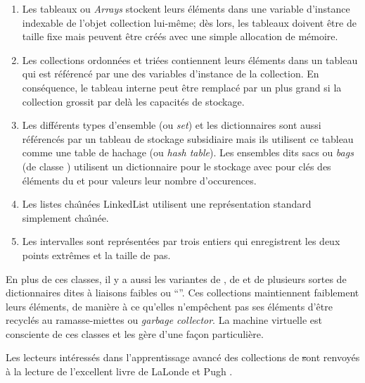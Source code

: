 \documentclass[a4paper,10pt,twoside]{book}
\begin{document}
\begin{enumerate}
  \item Les tableaux ou \emph{Arrays} stockent leurs \'el\'ements dans une
variable d'instance indexable de l'objet collection lui-m\^eme; 
d\`es lors, les tableaux doivent \^etre de taille fixe mais peuvent \^etre
cr\'e\'es avec une simple allocation de m\'emoire.
  \item Les collections ordonn\'ees  et tri\'ees 
 contiennent leurs \'el\'ements dans un tableau
qui est r\'ef\'erenc\'e par une des variables d'instance de la collection.
En cons\'equence, le tableau interne peut \^etre remplac\'e par un 
plus grand si la collection grossit par del\`a les capacit\'es de 
stockage.
  \item Les diff\'erents types d'ensemble (ou \emph{set}) et les dictionnaires
sont aussi r\'ef\'erenc\'es par un tableau de stockage subsidiaire
mais ils utilisent ce tableau comme une table de hachage (ou \emph{hash table}). Les ensembles dits sacs ou \emph{bags} (de classe ) utilisent
un dictionnaire  pour le stockage avec pour cl\'es
des \'el\'ements du  et pour valeurs leur nombre d'occurences.
  \item Les listes cha\^{\i}n\'ees LinkedList utilisent une
repr\'esentation standard simplement cha\^{\i}n\'ee.
  \item Les intervalles  sont repr\'esent\'ees 
par trois entiers qui enregistrent les deux points extr\^emes et la taille de pas.
\end{enumerate}
En plus de ces classes, il y a aussi 
les variantes de \mbox{,} de  et de plusieurs sortes de dictionnaires dites \`a liaisons faibles ou ``''. Ces collections
maintiennent faiblement leurs \'el\'ements, \ie
de mani\`ere \`a ce qu'elles n'emp\^echent pas ses \'el\'ements d'\^etre
recycl\'es au ramasse-miettes ou \emph{garbage collector}.
La machine virtuelle \sq est consciente de ces classes et les g\`ere d'une
fa\c{c}on particuli\`ere.

Les lecteurs int\'eress\'es dans l'apprentissage avanc\'e des collections
de \st sont renvoy\'es \`a la lecture de l'excellent livre de LaLonde et Pugh
\cite{LaLo90a}.
\end{document}
